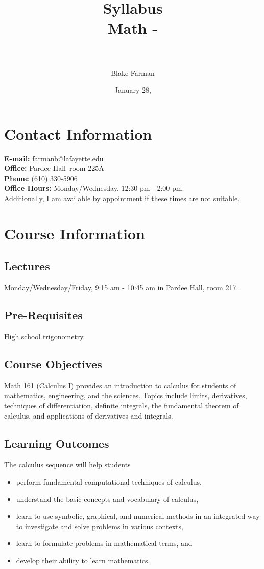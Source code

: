 \documentclass[12pt]{amsart}
\author[Blake Farman]{Blake Farman}
\title[Syllabus]{Syllabus\\Math \course-\courseSection \\ \semester\ \year}
\date{January 28, \year}
\def\building{Pardee Hall}
\def\officeNumber{225A}
\begin{document}
\maketitle

\section*{Contact Information}
\noindent
\textbf{E-mail:} \href{mailto:farmanb@lafayette.edu}{farmanb@lafayette.edu}\\
\textbf{Office:} \building\ room \officeNumber\\
\textbf{Phone:} (610) 330-5906\\
\textbf{Office Hours:} Monday/Wednesday, 12:30 pm - 2:00 pm.\\
Additionally, I am available by appointment if these times are not suitable.

\section*{Course Information}
\subsection*{Lectures}
Monday/Wednesday/Friday,  9:15 am - 10:45 am in Pardee Hall, room 217.\\

\subsection*{Pre-Requisites} High school trigonometry.\\

\subsection*{Course Objectives}
Math 161 (Calculus I) provides an introduction to calculus for students of mathematics, engineering, and the sciences. Topics include limits, derivatives, techniques of differentiation, definite integrals, the fundamental theorem of calculus, and applications of derivatives and integrals.\\

\subsection*{Learning Outcomes}
The calculus sequence will help students
\begin{itemize}
\item
  perform fundamental computational techniques of calculus,
\item
  understand the basic concepts and vocabulary of calculus,
\item
  learn to use symbolic, graphical, and numerical methods in an integrated way to investigate and solve problems in various contexts,
\item
  learn to formulate problems in mathematical terms, and
\item
  develop their ability to learn mathematics.
\end{itemize}
\end{document}
